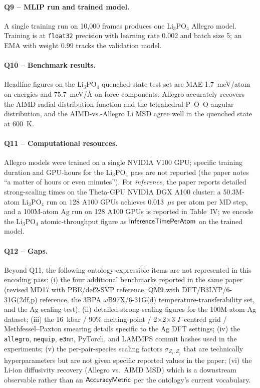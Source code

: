 \paragraph{Q9 -- MLIP run and trained model.}
A single training run on 10{,}000 frames produces one Li$_3$PO$_4$
Allegro model. Training is at \texttt{float32} precision with
learning rate 0.002 and batch size 5; an EMA with weight 0.99
tracks the validation model.


\paragraph{Q10 -- Benchmark results.}
Headline figures on the Li$_3$PO$_4$ quenched-state test set are
MAE 1.7~meV/atom on energies and 75.7~meV/\AA{} on force
components. Allegro accurately recovers the AIMD radial
distribution function and the tetrahedral P--O--O angular
distribution, and the AIMD-vs.-Allegro Li MSD agree well in the
quenched state at 600~K.


\paragraph{Q11 -- Computational resources.}
Allegro models were trained on a single NVIDIA V100 GPU; specific
training duration and GPU-hours for the Li$_3$PO$_4$ pass are not
reported (the paper notes ``a matter of hours or even minutes'').
For \emph{inference}, the paper reports detailed strong-scaling
times on the Theta-GPU NVIDIA DGX A100 cluster: a 50.3M-atom
Li$_3$PO$_4$ run on 128 A100 GPUs achieves 0.013~$\mu$s per atom
per MD step, and a 100M-atom Ag run on 128 A100 GPUs is reported
in Table~IV; we encode the Li$_3$PO$_4$ atomic-throughput figure
as $\mathsf{inferenceTimePerAtom}$ on the trained model.


\paragraph{Q12 -- Gaps.}
Beyond Q11, the following ontology-expressible items are not
represented in this encoding pass: (i) the four additional
benchmarks reported in the same paper (revised MD17 with
PBE/def2-SVP reference, QM9 with DFT/B3LYP/6-31G(2df,p) reference,
the 3BPA $\omega$B97X/6-31G(d) temperature-transferability set,
and the Ag scaling test); (ii) detailed strong-scaling figures for
the 100M-atom Ag dataset; (iii) the 16~kbar / 90\% melting-point /
2$\times$2$\times$3 $\Gamma$-centred grid / Methfessel--Paxton
smearing details specific to the Ag DFT settings; (iv) the
\texttt{allegro}, \texttt{nequip}, \texttt{e3nn}, PyTorch, and
LAMMPS commit hashes used in the experiments; (v) the per-pair-species
scaling factors $\sigma_{Z_i,Z_j}$ that are technically
hyperparameters but are not given specific reported values in the
paper; (vi) the Li-ion diffusivity recovery (Allegro vs.\ AIMD MSD)
which is a downstream observable rather than an
$\mathsf{AccuracyMetric}$ per the ontology's current vocabulary.
